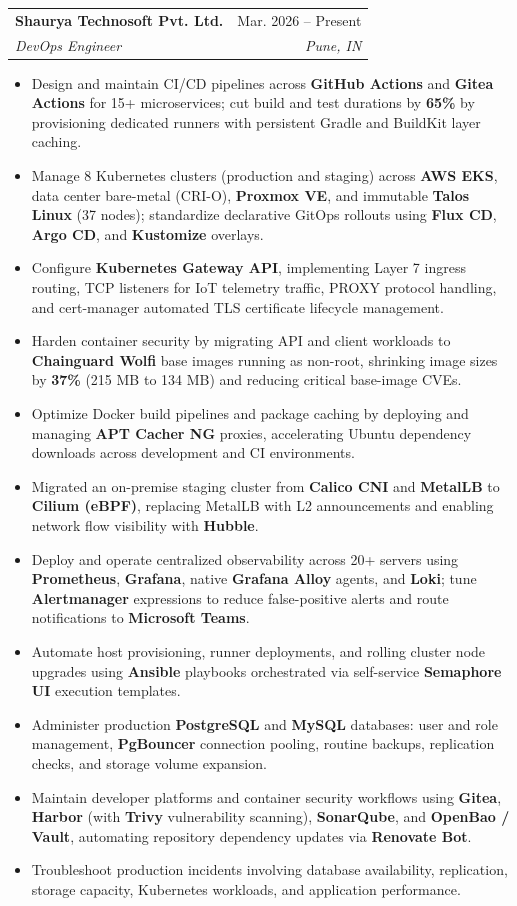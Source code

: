 \documentclass[letterpaper,11pt]{article}
\makeatletter
\newcommand{\resumeItem}[1]{
  \item\small{
    {#1 \vspace{-3pt}}
  }
}
\newcommand{\resumeSubheading}[4]{
  \vspace{-2pt}\item
    \begin{tabular*}{0.97\textwidth}[t]{l@{\extracolsep{\fill}}r}
      \textbf{#1} & #2 \\
      \textit{\small#3} & \textit{\small #4} \\
    \end{tabular*}\vspace{-7pt}
}
\newcommand{\resumeItemListStart}{\begin{itemize}}
\newcommand{\resumeItemListEnd}{\end{itemize}\vspace{-5pt}}
\makeatother
\begin{document}
\resumeSubheading
{Shaurya Technosoft Pvt. Ltd.}{Mar. 2026 -- Present}
{DevOps Engineer}{Pune, IN}
\resumeItemListStart
\resumeItem{Design and maintain CI/CD pipelines across \textbf{GitHub Actions} and \textbf{Gitea Actions} for 15+ microservices; cut build and test durations by \textbf{65\%} by provisioning dedicated runners with persistent Gradle and BuildKit layer caching.}
\resumeItem{Manage 8 Kubernetes clusters (production and staging) across \textbf{AWS EKS}, data center bare-metal (CRI-O), \textbf{Proxmox VE}, and immutable \textbf{Talos Linux} (37 nodes); standardize declarative GitOps rollouts using \textbf{Flux CD}, \textbf{Argo CD}, and \textbf{Kustomize} overlays.}
\resumeItem{Configure \textbf{Kubernetes Gateway API}, implementing Layer 7 ingress routing, TCP listeners for IoT telemetry traffic, PROXY protocol handling, and cert-manager automated TLS certificate lifecycle management.}
\resumeItem{Harden container security by migrating API and client workloads to \textbf{Chainguard Wolfi} base images running as non-root, shrinking image sizes by \textbf{37\%} (215 MB to 134 MB) and reducing critical base-image CVEs.}
\resumeItem{Optimize Docker build pipelines and package caching by deploying and managing \textbf{APT Cacher NG} proxies, accelerating Ubuntu dependency downloads across development and CI environments.}
\resumeItem{Migrated an on-premise staging cluster from \textbf{Calico CNI} and \textbf{MetalLB} to \textbf{Cilium (eBPF)}, replacing MetalLB with L2 announcements and enabling network flow visibility with \textbf{Hubble}.}
\resumeItem{Deploy and operate centralized observability across 20+ servers using \textbf{Prometheus}, \textbf{Grafana}, native \textbf{Grafana Alloy} agents, and \textbf{Loki}; tune \textbf{Alertmanager} expressions to reduce false-positive alerts and route notifications to \textbf{Microsoft Teams}.}
\resumeItem{Automate host provisioning, runner deployments, and rolling cluster node upgrades using \textbf{Ansible} playbooks orchestrated via self-service \textbf{Semaphore UI} execution templates.}
\resumeItem{Administer production \textbf{PostgreSQL} and \textbf{MySQL} databases: user and role management, \textbf{PgBouncer} connection pooling, routine backups, replication checks, and storage volume expansion.}
\resumeItem{Maintain developer platforms and container security workflows using \textbf{Gitea}, \textbf{Harbor} (with \textbf{Trivy} vulnerability scanning), \textbf{SonarQube}, and \textbf{OpenBao / Vault}, automating repository dependency updates via \textbf{Renovate Bot}.}
\resumeItem{Troubleshoot production incidents involving database availability, replication, storage capacity, Kubernetes workloads, and application performance.}
\resumeItemListEnd
\end{document}
